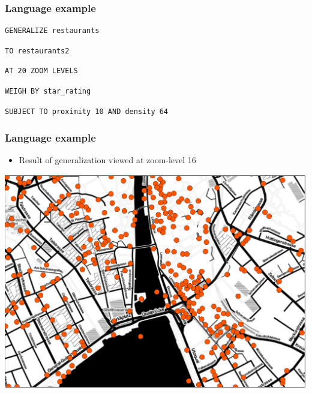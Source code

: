 \documentclass{beamer}
\begin{document}
\begin{frame}[fragile,t]
  \frametitle{Language example}
  \begin{description}[<+->]
  \item
  \begin{lstlisting}
GENERALIZE restaurants 
\end{lstlisting}
  \item
\begin{lstlisting}
TO restaurants2
\end{lstlisting}
  \item
\begin{lstlisting}
AT 20 ZOOM LEVELS
\end{lstlisting}
  \item
\begin{lstlisting}
WEIGH BY star_rating
\end{lstlisting}
  \item
\begin{lstlisting}    
SUBJECT TO proximity 10 AND density 64
\end{lstlisting}    
  \end{description}
\end{frame}

\begin{frame}[fragile,t]
  \frametitle{Language example}
  \begin{itemize}
  \item Result of generalization viewed at zoom-level 16
  \end{itemize}
  \begin{center}
  	\includegraphics[scale=0.30]{figs/zoom16.pdf}
  \end{center}

\end{frame}
\end{document}
